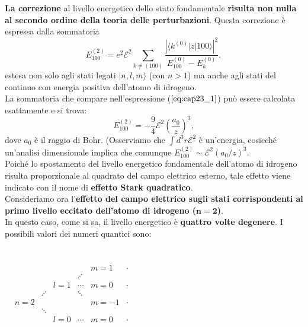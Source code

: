 \textbf{La correzione} al livello energetico dello stato fondamentale \textbf{risulta non nulla al secondo ordine della teoria delle perturbazioni}. Questa correzione è espressa dalla sommatoria
\begin{equation}
\label{eq:cap23_1}
E^{(2)}_{100}=e^2 \mathcal{E}^2 \sum_{k\neq(100)}\frac{\left| \langle k^{(0)} | z |100 \rangle \right|^2}{E^{(0)}_{100}-E^{(0)}_{k}},
\end{equation}
estesa non solo agli stati legati $|n,l,m \rangle$ (con $n>1$) ma anche agli stati del continuo con energia positiva dell'atomo di idrogeno.\\
La sommatoria che compare nell'espressione ($\ref{eq:cap23_1}$) può essere calcolata esattamente e si trova:
\begin{equation}
E^{(2)}_{100}=-\frac{9}{4} \mathcal{E}^2 \left( \frac{a_0}{z} \right)^3,
\end{equation}
dove $a_0$ è il raggio di Bohr. (Osserviamo che $\int d^3r \mathcal{E}^2$ è un'energia, cosicché un'analisi dimensionale implica che comunque $E^{(2)}_{100}\sim\mathcal{E}^2\left( a_0/z \right)^3 $.\\
Poiché lo spostamento del livello energetico fondamentale dell'atomo di idrogeno risulta proporzionale al quadrato del campo elettrico esterno, tale effetto viene indicato con il nome di \textbf{effetto Stark quadratico}.\\
Consideriamo ora l'\textbf{effetto del campo elettrico sugli stati corrispondenti al primo livello eccitato dell'atomo di idrogeno ($\boldsymbol{n=2}$)}.\\
In questo caso, come si sa, il livello energetico è \textbf{quattro volte degenere}. I possibili valori dei numeri quantici sono: \\ \\
\begin{center}
$\begin{matrix} 
& &  &  &  & & \\
  & &  &  &  & m=1 & \cdot  \\
 &  &  &  & \iddots & &  \\
 &  &  & l=1 & \cdots & m=0 & \cdot \\
 &  & \iddots &  & \ddots & & \\
&  n=2 &  &  &  & m=-1 & \cdot \\
 &  & \ddots  & &  &  & \\
 &   &  & l=0 & \cdots & m=0 & \cdot \\
 & &  &  &  & & 
 \end{matrix}$ 
\end{center} 
